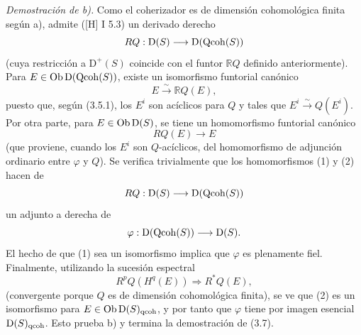 \providecommand{\sisi}[2]{#2}

\emph{Demostración de b).} Como el coherizador es de dimensión cohomológica finita según a), admite ([H] I 5.3) un derivado derecho
\[
 RQ:\mathrm D(S)\longrightarrow\mathrm D(\operatorname{Qcoh}(S))
\]
(cuya restricción a $\mathrm D^+(S)$ coincide con el funtor $\mathbb RQ$ definido anteriormente). Para $E\in\operatorname{Ob}\mathrm D(\operatorname{Qcoh}(S))$, existe un isomorfismo funtorial canónico
\begin{equation}\tag{1}
 E\xrightarrow{\sim}\mathbb RQ(E),
\end{equation}
puesto que, según (3.5.1), los $E^i$ son acíclicos para $Q$ y tales que $E^i\xrightarrow{\sim}Q(E^i)$. Por otra parte, para $E\in\operatorname{Ob}\mathrm D(S)$, se tiene un homomorfismo funtorial canónico
\begin{equation}\tag{2}
 RQ(E)\longrightarrow E
\end{equation}
(que proviene, cuando los $E^i$ son $Q$-acíclicos, del homomorfismo de adjunción ordinario entre $\varphi$ y $Q$). Se verifica trivialmente que los homomorfismos (1) y (2) hacen de
\[
 RQ:\mathrm D(S)\longrightarrow\mathrm D(\operatorname{Qcoh}(S))
\]
un adjunto a derecha de
\[
 \varphi:\mathrm D(\operatorname{Qcoh}(S))\longrightarrow\mathrm D(S).
\]
El hecho de que (1) sea un isomorfismo implica que $\varphi$ es plenamente fiel. Finalmente, utilizando la sucesión espectral
\[
 R^pQ(H^q(E))\Longrightarrow R^{*}Q(E),
\]
(convergente porque $Q$ es de dimensión cohomológica finita), se ve que (2) es un isomorfismo para $E\in\operatorname{Ob}\mathrm D(S)_{\mathrm{qcoh}}$, y por tanto que $\varphi$ tiene por imagen esencial $\mathrm D(S)_{\mathrm{qcoh}}$. Esto prueba b) y termina la demostración de (3.7).

